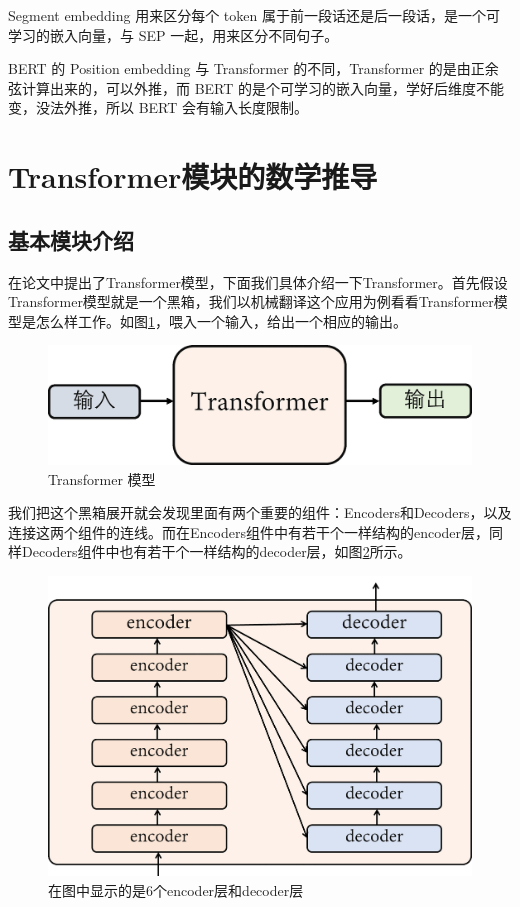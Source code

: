 \documentclass[]{article}
\begin{document}
Segment embedding 用来区分每个 token 属于前一段话还是后一段话，是一个可学习的嵌入向量，与 SEP 一起，用来区分不同句子。

BERT 的 Position embedding 与 Transformer 的不同，Transformer 的是由正余弦计算出来的，可以外推，而 BERT 的是个可学习的嵌入向量，学好后维度不能变，没法外推，所以 BERT 会有输入长度限制。

\section{Transformer模块的数学推导}
\subsection{基本模块介绍}
在论文\cite{vaswani2017attention}中提出了Transformer模型，下面我们具体介绍一下Transformer。首先假设Transformer模型就是一个黑箱，我们以机械翻译这个应用为例看看Transformer模型是怎么样工作。如图\ref{fig:003}，喂入一个输入，给出一个相应的输出。

\begin{figure}[htbp]
	\centering
	\includegraphics[width=0.6\linewidth]{figures/003}
	\caption{Transformer 模型}
	\label{fig:003}
\end{figure}

我们把这个黑箱展开就会发现里面有两个重要的组件：Encoders和Decoders，以及连接这两个组件的连线。而在Encoders组件中有若干个一样结构的encoder层，同样Decoders组件中也有若干个一样结构的decoder层，如图\ref{fig:004}所示。
\begin{figure}[htbp]
	\centering
	\includegraphics[width=0.6\linewidth]{figures/004}
	\caption{在图中显示的是6个encoder层和decoder层}
	\label{fig:004}
\end{figure}
\end{document}
